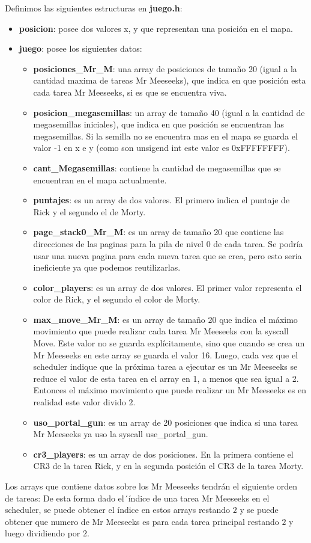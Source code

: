 \documentclass[a4paper]{article}
\begin{document}
\justify
Definimos las siguientes estructuras en \textbf{juego.h}:
\begin{itemize}
	\item \textbf{posicion}: posee dos valores x, y que representan una posición en el mapa.
	\item \textbf{juego}: posee los siguientes datos:
	\begin{itemize}
		\item \textbf{posiciones_Mr_M}: una array de posiciones de tamaño 20 (igual a la cantidad maxima de tareas Mr Meeseeks), que indica en que posición esta cada tarea Mr Meeseeks, si es que se encuentra viva.
		\item \textbf{posicion_megasemillas}: un array de tamaño 40 (igual a la cantidad de megasemillas iniciales), que indica en que posición se encuentran las megasemillas. Si la semilla no se encuentra mas en el mapa se guarda el valor -1 en x e y (como son unsigend int este valor es 0xFFFFFFFF).
		\item \textbf{cant_Megasemillas}: contiene la cantidad de megasemillas que se encuentran en el mapa actualmente.
		\item \textbf{puntajes}: es un array de dos valores. El primero indica el puntaje de Rick y el segundo el de Morty.
		\item \textbf{page_stack0_Mr_M}: es un array de tamaño 20 que contiene las direcciones de las paginas para la pila de nivel 0 de cada tarea. Se podría usar una nueva pagina para cada nueva tarea que se crea, pero esto seria ineficiente ya que podemos reutilizarlas.
		\item \textbf{color_players}: es un array de dos valores. El primer valor representa el color de Rick, y el segundo el color de Morty.
		\item \textbf{max_move_Mr_M}: es un array de tamaño 20 que  indica el máximo movimiento que puede realizar cada tarea Mr Meeseeks con la syscall Move. Este valor no se guarda explícitamente, sino que cuando se crea un Mr Meeseeks en este array se guarda el valor 16. Luego, cada vez que el scheduler indique que la próxima tarea a ejecutar es un Mr Meeseeks se reduce el valor de esta tarea en el array en 1, a menos que sea igual a 2. Entonces el máximo movimiento que puede realizar un Mr Meeseeks es en realidad este valor divido $2$.
		\item \textbf{uso_portal_gun}: es un array de 20 posiciones que indica si una tarea Mr Meeseeks ya uso la syscall use_portal_gun.
		\item \textbf{cr3_players}: es un array de dos posiciones. En la primera contiene el CR3 de la tarea Rick, y en la segunda posición el CR3 de la tarea Morty.
	\end{itemize}
\end{itemize}
Los arrays que contiene datos sobre los Mr Meeseeks tendrán el siguiente orden de tareas:
\justify
De esta forma dado el´índice de una tarea Mr Meeseeks en el scheduler, se puede obtener el índice en estos arrays restando $2$ y se puede obtener que numero de Mr Meeseeks es para cada tarea principal restando $2$ y luego dividiendo por $2$.
\end{document}
